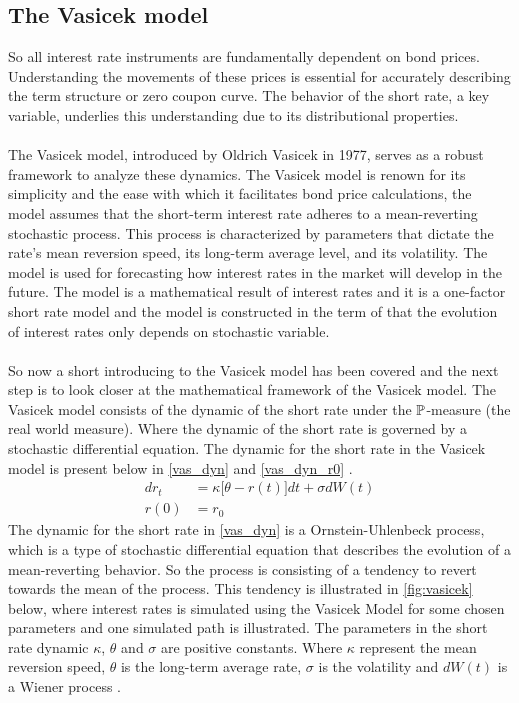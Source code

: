 \subsection{The Vasicek model}
So all interest rate instruments are fundamentally dependent on bond prices. Understanding the movements of 
these prices is essential for accurately describing the term structure or zero coupon curve. The behavior 
of the short rate, a key variable, underlies this understanding due to its distributional properties.
\\\\
The Vasicek model, introduced by Oldrich Vasicek in 1977, serves as a robust framework to analyze these dynamics.
The Vasicek model is renown for its simplicity and the ease with which it facilitates bond price calculations, 
the model assumes that the short-term interest rate adheres to a mean-reverting stochastic process. This process is characterized 
by parameters that dictate the rate's mean reversion speed, its long-term average level, and its volatility.
The model is used for forecasting how interest rates in the market will develop in the future. The model is a
mathematical result of interest rates and it is a one-factor short rate model and the model is constructed in the 
term of that the evolution of interest rates only depends on stochastic variable.
\\\\
So now a short introducing to the Vasicek model has been covered and the next step is to look closer at the 
mathematical framework of the Vasicek model. The Vasicek model consists of the dynamic of the short rate under the $\mathbb{P}$-measure
(the real world measure). Where the dynamic of the short rate is governed by a stochastic differential equation. 
The dynamic for the short rate in the Vasicek model is present below in \autoref{vas_dyn} and \autoref{vas_dyn_r0} \cite{Bjork}.
\begin{align}
    d r_t &= \kappa \Big[\theta -r(t)\Big] dt + \sigma d W(t) \label{vas_dyn}\\
    r(0) &= r_0 \label{vas_dyn_r0}
\end{align}
The dynamic for the short rate in \autoref{vas_dyn} is a Ornstein-Uhlenbeck process, which is a type of stochastic 
differential equation that describes the evolution of a mean-reverting behavior. So the process is consisting of a 
tendency to revert towards the mean of the process. This tendency is illustrated in \autoref{fig:vasicek} below, where 
interest rates is simulated using the Vasicek Model for some chosen parameters and one simulated path is illustrated. The parameters in the short rate dynamic
$\kappa$, $\theta$ and $\sigma$ are positive constants. Where $\kappa$ represent the mean reversion speed, $\theta$ 
is the long-term average rate, $\sigma$ is the volatility  and $dW(t)$ is a Wiener process \cite{Bermudan}. 

